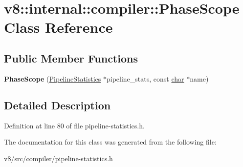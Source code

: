 \hypertarget{classv8_1_1internal_1_1compiler_1_1PhaseScope}{}\section{v8\+:\+:internal\+:\+:compiler\+:\+:Phase\+Scope Class Reference}
\label{classv8_1_1internal_1_1compiler_1_1PhaseScope}
\subsection*{Public Member Functions}
\begin{DoxyCompactItemize}
\item 
\mbox{\label{classv8_1_1internal_1_1compiler_1_1PhaseScope_a24b1a97bcb70ca49dbdc374ac5efa322}} 
{\bfseries Phase\+Scope} (\mbox{\hyperlink{classv8_1_1internal_1_1compiler_1_1PipelineStatistics}{Pipeline\+Statistics}} $\ast$pipeline\+\_\+stats, const \mbox{\hyperlink{classchar}{char}} $\ast$name)
\end{DoxyCompactItemize}


\subsection{Detailed Description}


Definition at line 80 of file pipeline-\/statistics.\+h.



The documentation for this class was generated from the following file\+:\begin{DoxyCompactItemize}
\item 
v8/src/compiler/pipeline-\/statistics.\+h\end{DoxyCompactItemize}
